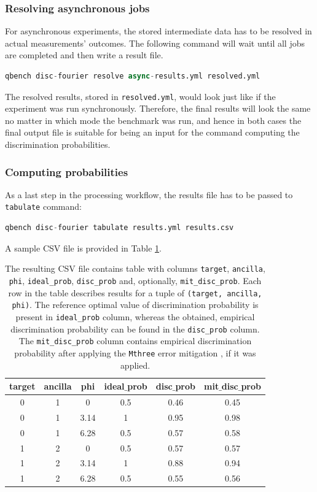\documentclass[preprint,12pt, a4paper, dvipsnames]{elsarticle}
\newcommand{\1}{{\rm 1\hspace{-0.9mm}l}}
\theoremstyle{definition}
\begin{document}
\subsubsection{Resolving asynchronous jobs}
For asynchronous experiments, the stored intermediate data has to be resolved in actual
measurements' outcomes. The following command will wait until all jobs are completed and then write
a result file.
\begin{lstlisting}[language=Python]
qbench disc-fourier resolve async-results.yml resolved.yml
\end{lstlisting}
The resolved results, stored in \texttt{resolved.yml}, would look just like if the experiment was
run synchronously. Therefore, the final results will look the same no matter in which mode the
benchmark was run, and hence in both cases the final output file is suitable for being an input for
the command computing the discrimination probabilities.

\subsubsection{Computing probabilities}
As a last step in the processing workflow, the results file has to be passed to \texttt{tabulate}
command:
\begin{lstlisting}[language=Python]
qbench disc-fourier tabulate results.yml results.csv
\end{lstlisting}
A sample CSV file is provided in Table \ref{fig:tabulateresults}.
\begin{table}[ht!]
\begin{center}
	\begin{tabular}{|c c c c c c|} 
		\hline
		target & ancilla & phi & ideal$\_$prob  & disc$\_$prob & mit$\_$disc$\_$prob \\ [0.5ex] 
		\hline\hline
		0 & 1 & 0 & 0.5 & 0.46 & 0.45  \\ 
		\hline
		0 & 1 & 3.14 & 1 & 0.95 & 0.98  \\
		\hline
		0 & 1 & 6.28 & 0.5 & 0.57 & 0.58  \\
		\hline
		1 & 2 & 0 & 0.5  & 0.57 & 0.57 \\
		\hline
		1 & 2 & 3.14 & 1 & 0.88 & 0.94  \\ 
		\hline
		1 & 2 & 6.28 & 0.5 & 0.55 & 0.56  \\ 
		\hline
	\end{tabular}
\caption{The resulting CSV file contains table with columns \texttt{target}, \texttt{ancilla}, \texttt{phi},
	\texttt{ideal\_prob}, \texttt{disc\_prob} and, optionally, \texttt{mit\_disc\_prob}. Each row in the
	table describes results for a tuple of \texttt{(target, ancilla, phi)}.  The reference optimal value
	of discrimination probability is present in \texttt{ideal\_prob} column, whereas the obtained,
	empirical discrimination probability can be found in the \texttt{disc\_prob} column. The
	\texttt{mit\_disc\_prob} column contains empirical discrimination probability after applying the
	\texttt{Mthree} error mitigation \cite{mthree, mthreepublication}, if it was applied.}
\label{fig:tabulateresults}
\end{center}
\end{table}
\end{document}
